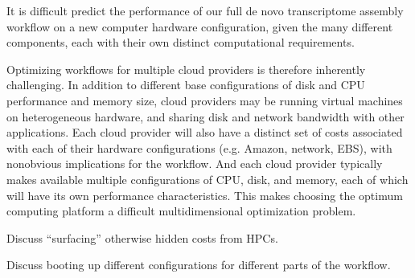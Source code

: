\documentclass[11pt]{article}
\begin{document}
It is difficult predict the performance of our full de novo
transcriptome assembly workflow on a new computer hardware
configuration, given the many different components, each with
their own distinct computational requirements.  

Optimizing workflows for multiple cloud providers is therefore
inherently challenging.  In addition to different base configurations
of disk and CPU performance and memory size, cloud providers may be
running virtual machines on heterogeneous hardware, and sharing disk
and network bandwidth with other applications.  Each cloud provider
will also have a distinct set of costs associated with each of their
hardware configurations (e.g. Amazon, network, EBS), with nonobvious
implications for the workflow.  And each cloud provider typically
makes available multiple configurations of CPU, disk, and memory, each
of which will have its own performance characteristics.  This makes
choosing the optimum computing platform a difficult multidimensional
optimization problem.

Discuss ``surfacing'' otherwise hidden costs from HPCs.

Discuss booting up different configurations for different parts of the
workflow.
\end{document}
